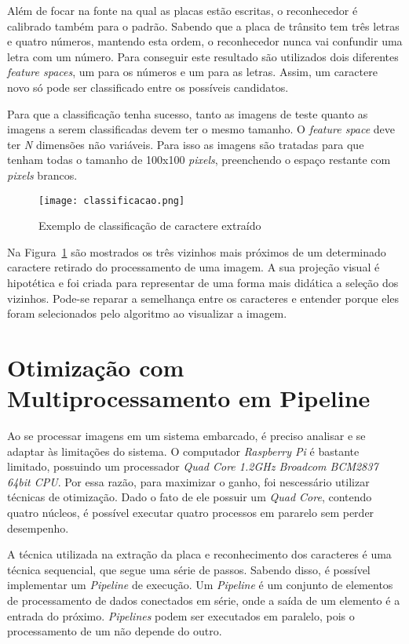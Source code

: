 Além de focar na fonte na qual as placas estão escritas, o reconhecedor é calibrado também para o padrão. Sabendo que a placa de trânsito tem três letras e quatro números, mantendo esta ordem, o reconhecedor nunca vai confundir uma letra com um número. Para conseguir este resultado são utilizados dois diferentes \emph{feature spaces}, um para os números e um para as letras. Assim, um caractere novo só pode ser classificado entre os possíveis candidatos.

Para que a classificação tenha sucesso, tanto as imagens de teste quanto as imagens a serem classificadas devem ter o mesmo tamanho. O \emph{feature space} deve ter \emph{N} dimensões não variáveis. Para isso as imagens são tratadas para que tenham todas o tamanho de 100x100 \emph{pixels}, preenchendo o espaço restante com \emph{pixels} brancos.

\begin{figure}[H]
	\centering
	\texttt{[image: classificacao.png]}
	\caption{Exemplo de classificação de caractere extraído}
	\label{fig:classificacao}
\end{figure}

Na Figura~\ref{fig:classificacao} são mostrados os três vizinhos mais próximos de um determinado caractere retirado do processamento de uma imagem. A sua projeção visual é hipotética e foi criada para representar de uma forma mais didática a seleção dos vizinhos. Pode-se reparar a semelhança entre os caracteres e entender porque eles foram selecionados pelo algoritmo ao visualizar a imagem.

\section{Otimização com Multiprocessamento em Pipeline} \label{sec:otimizacao}

Ao se processar imagens em um sistema embarcado, é preciso analisar e se adaptar às limitações do sistema. O computador \emph{Raspberry Pi} é bastante limitado, possuindo um processador \emph{Quad Core 1.2GHz Broadcom BCM2837 64bit CPU}. Por essa razão, para maximizar o ganho, foi nescessário utilizar técnicas de otimização. Dado o fato de ele possuir um \emph{Quad Core}, contendo quatro núcleos, é possível executar quatro processos em pararelo sem perder desempenho. 

A técnica utilizada na extração da placa e reconhecimento dos caracteres é uma técnica sequencial, que segue uma série de passos. Sabendo disso, é possível implementar um \emph{Pipeline} de execução. Um \emph{Pipeline} é um conjunto de elementos de processamento de dados conectados em série, onde a saída de um elemento é a entrada do próximo. \emph{Pipelines} podem ser executados em paralelo, pois o processamento de um não depende do outro.

